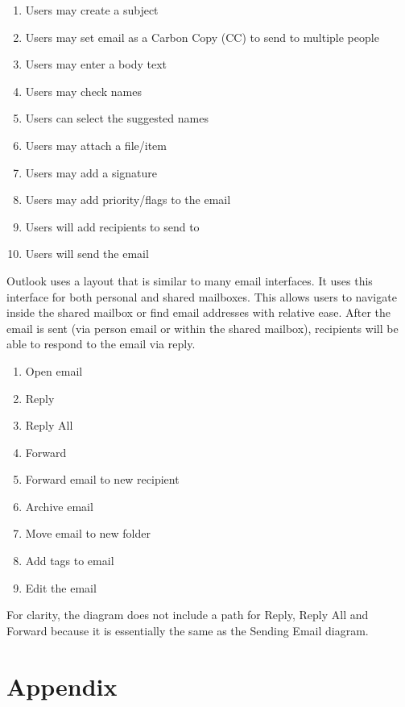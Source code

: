 \documentclass{sigchi}
\begin{document}
\begin{enumerate}
\item Users may create a subject
\item Users may set email as a Carbon Copy (CC) to send to multiple people
\item Users may enter a body text
\item Users may check names
\item Users can select the suggested names
\item Users may attach a file/item
\item Users may add a signature
\item Users may add priority/flags to the email
\item Users will add recipients to send to
\item Users will send the email
\end{enumerate}

Outlook uses a layout that is similar to many email interfaces. It uses this interface for both personal and shared mailboxes. This allows users to navigate inside the shared mailbox or find email addresses with relative ease.
After the email is sent (via person email or within the shared mailbox), recipients will be able to respond to the email via reply.

\begin{enumerate}
\item Open email
\item Reply
\item Reply All
\item Forward
\item Forward email to new recipient
\item Archive email
\item Move email to new folder
\item Add tags to email
\item Edit the email
\end{enumerate}

For clarity, the diagram does not include a path for Reply, Reply All and Forward because it is essentially the same as the Sending Email diagram.

\balance{}

\newpage




\section{Appendix}
\end{document}
